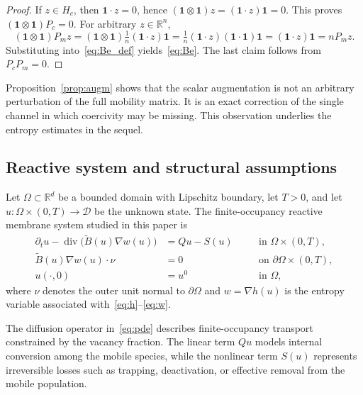 \documentclass{article}
\newcommand{\R}{\mathbb{R}}
\newcommand{\bone}{\mathbf{1}}
\newcommand{\D}{\mathcal{D}}
\newcommand{\Be}{\widetilde{B}}       %
\newcommand{\Pc}{P_c}                 %
\newcommand{\Pm}{P_m}                 %
\newcommand{\Hc}{H_c}                 %
\begin{document}
\begin{proof}
If $z\in\Hc$, then $\bone\cdot z=0$, hence
$(\bone\otimes\bone)z = (\bone\cdot z)\bone = 0$.
This proves $(\bone\otimes\bone)\Pc=0$. For arbitrary $z\in\R^n$,
\[
  (\bone\otimes\bone)\Pm z
  = (\bone\otimes\bone)\tfrac{1}{n}(\bone\cdot z)\bone
  = \tfrac{1}{n}(\bone\cdot z)(\bone\cdot\bone)\bone
  = (\bone\cdot z)\bone = n\Pm z.
\]
Substituting into~\eqref{eq:Be_def} yields~\eqref{eq:Be}. The last
claim follows from $\Pc\Pm=0$.
\end{proof}

Proposition~\ref{prop:augm} shows that the scalar augmentation is not
an arbitrary perturbation of the full mobility matrix. It is an exact
correction of the single channel in which coercivity may be missing.
This observation underlies the entropy estimates in the sequel.

\subsection{Reactive system and structural assumptions}

Let $\Omega\subset\R^d$ be a bounded domain with Lipschitz boundary,
let $T>0$, and let $u:\Omega\times(0,T)\to\D$ be the unknown state.
The finite-occupancy reactive membrane system studied in this paper is
\begin{subequations}\label{eq:sys}
\begin{alignat}{2}
  \partial_t u - \operatorname{div}\bigl(\Be(u)\nabla w(u)\bigr)
    &= Qu - S(u)
    &&\quad\text{in }\Omega\times(0,T),
    \label{eq:pde}\\
  \Be(u)\nabla w(u)\cdot\nu
    &= 0
    &&\quad\text{on }\partial\Omega\times(0,T),
    \label{eq:bc}\\
  u(\cdot,0) &= u^0
    &&\quad\text{in }\Omega,
    \end{alignat}
\end{subequations}
where $\nu$ denotes the outer unit normal to $\partial\Omega$ and
$w=\nabla h(u)$ is the entropy variable associated with~\eqref{eq:h}--\eqref{eq:w}.

The diffusion operator in~\eqref{eq:pde} describes finite-occupancy
transport constrained by the vacancy fraction. The linear term $Qu$
models internal conversion among the mobile species, while the nonlinear
term $S(u)$ represents irreversible losses such as trapping,
deactivation, or effective removal from the mobile population.
\end{document}
